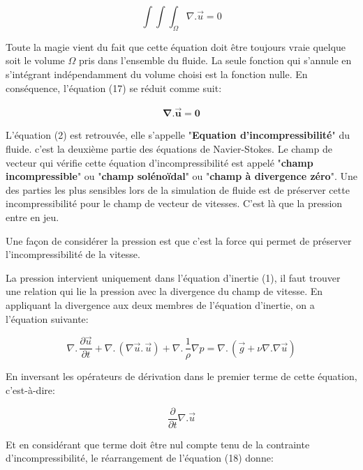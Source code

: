 \documentclass[11pt]{report}
\begin{document}
\begin{equation}
\int \!\!\!\! \int \!\!\!\! \int_{\Omega} \nabla . \overrightarrow{u} = 0
\end{equation}

Toute la magie vient du fait que cette équation doit être toujours vraie quelque soit le volume $ \Omega $ pris dans l'ensemble du fluide. La seule fonction qui s'annule en s'intégrant indépendamment du volume choisi est la fonction nulle. En conséquence, l'équation (17) se réduit comme suit:

\begin{eqnarray*}
\mathbf{\nabla . \overrightarrow{u} = 0}
\end{eqnarray*}

L'équation (2) est retrouvée, elle s'appelle "\textbf{Equation d'incompressibilité}" du fluide. c'est la deuxième partie des équations de Navier-Stokes.
Le champ de vecteur qui vérifie cette équation d'incompressibilité est appelé "\textbf{champ incompressible}" ou "\textbf{champ solénoïdal}" ou "\textbf{champ à divergence zéro}". Une des parties les plus sensibles lors de la simulation de fluide est de préserver cette incompressibilité pour le champ de vecteur de vitesses. C'est là que la pression entre en jeu.

Une façon de considérer la pression est que c'est la force qui permet de préserver l'incompressibilité de la vitesse.

La pression intervient uniquement dans l'équation d'inertie (1), il faut trouver une relation qui lie la pression avec la divergence du champ de vitesse. En appliquant la divergence aux deux membres de l'équation d'inertie, on a l'équation suivante:

\begin{equation}
\nabla . \, \frac{\partial \overrightarrow{u}}{\partial t} + \nabla . \, (\nabla \overrightarrow{u}. \,  \overrightarrow{u}) + \nabla . \, \frac{1}{\rho} \nabla p  =  \nabla . \, (\overrightarrow{g} + \nu \nabla . \nabla \overrightarrow{u})
\end{equation}

En inversant les opérateurs de dérivation dans le premier terme de cette équation, c'est-à-dire:

\begin{equation}
\frac{\partial }{\partial t}\nabla .\overrightarrow{u}
\end{equation}

Et en considérant que terme doit être nul compte tenu de la contrainte d'incompressibilité, le réarrangement de l'équation (18) donne:
\end{document}
